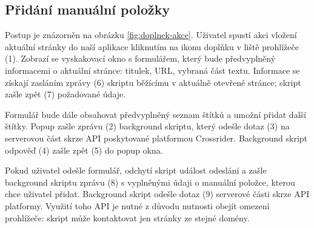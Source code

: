 \subsection{Přidání manuální položky}

Postup je znázorněn na obrázku \ref{fig:doplnek-akce}.
Uživatel spustí akci vložení aktuální stránky do naší aplikace kliknutím na ikonu doplňku v liště prohlížeče (1).
Zobrazí se vyskakovací okno s formulářem, který bude předvyplněný informacemi o aktuální stránce: titulek, URL, vybraná část textu.
Informace se získají zasláním zprávy (6) skriptu běžícímu v aktuálně otevřené stránce; skript zašle zpět (7) požadované údaje.

Formulář bude dále obsahovat předvyplněný seznam štítků a umožní přidat další štítky.
Popup zašle zprávu (2) background skriptu, který odešle dotaz (3) na serverovou část skrze API poskytované platformou Crossrider.
Background skript odpověď (4) zašle zpět (5) do popup okna.

Pokud uživatel odešle formulář, odchytí skript událost odeslání a zašle background skriptu zprávu (8) s vyplněnými údaji o manuální položce, kterou chce uživatel přidat.
Background skript odešle dotaz (9) serverové části skrze API platformy.
Využití toho API je nutné z důvodu nutnosti obejít omezení prohlížeče: skript může kontaktovat jen stránky ze stejné domény.
